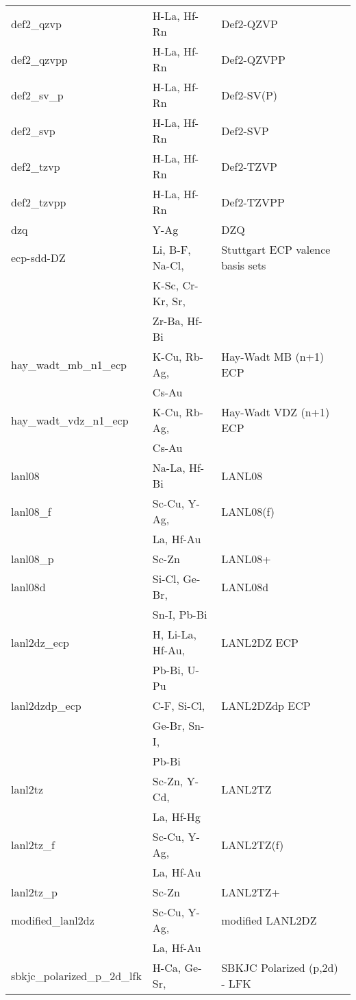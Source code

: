 \begin{longtable}{lll}
def2\_qzvp & H-La, Hf-Rn & Def2-QZVP\\
def2\_qzvpp & H-La, Hf-Rn & Def2-QZVPP\\
def2\_sv\_p & H-La, Hf-Rn & Def2-SV(P)\\
def2\_svp & H-La, Hf-Rn & Def2-SVP\\
def2\_tzvp & H-La, Hf-Rn & Def2-TZVP\\
def2\_tzvpp & H-La, Hf-Rn & Def2-TZVPP\\
dzq & Y-Ag & DZQ\\
ecp-sdd-DZ & Li, B-F, Na-Cl, & Stuttgart ECP valence basis sets\\
           & K-Sc, Cr-Kr, Sr, &\\
           & Zr-Ba, Hf-Bi &\\
hay\_wadt\_mb\_n1\_ecp & K-Cu, Rb-Ag, & Hay-Wadt MB (n+1) ECP\\
                       & Cs-Au &\\
hay\_wadt\_vdz\_n1\_ecp & K-Cu, Rb-Ag, & Hay-Wadt VDZ (n+1) ECP\\
                        & Cs-Au &\\
lanl08 & Na-La, Hf-Bi & LANL08\\
lanl08\_f & Sc-Cu, Y-Ag, & LANL08(f)\\
          & La, Hf-Au &\\
lanl08\_p & Sc-Zn & LANL08+\\
lanl08d & Si-Cl, Ge-Br, & LANL08d\\
        & Sn-I, Pb-Bi &\\
lanl2dz\_ecp & H, Li-La, Hf-Au, & LANL2DZ ECP\\
             & Pb-Bi, U-Pu &\\
lanl2dzdp\_ecp & C-F, Si-Cl, & LANL2DZdp ECP\\
               & Ge-Br, Sn-I, &\\
               & Pb-Bi &\\
lanl2tz & Sc-Zn, Y-Cd, & LANL2TZ\\
        & La, Hf-Hg &\\
lanl2tz\_f & Sc-Cu, Y-Ag, & LANL2TZ(f)\\
           & La, Hf-Au &\\
lanl2tz\_p & Sc-Zn & LANL2TZ+\\
modified\_lanl2dz & Sc-Cu, Y-Ag, & modified LANL2DZ\\
                  & La, Hf-Au &\\
sbkjc\_polarized\_p\_2d\_lfk & H-Ca, Ge-Sr, & SBKJC Polarized (p,2d) - LFK\\

\end{longtable}

